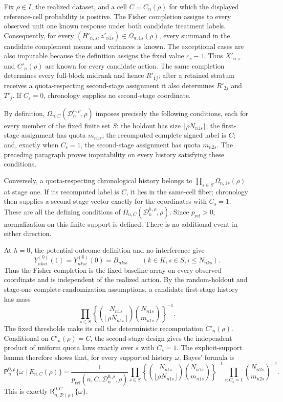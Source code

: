Fix \(\rho\in I\), the realized dataset, and a cell \(C=C_n(\rho)\) for which the displayed reference-cell probability is positive.  The Fisher completion assigns to every observed unit one known response under both candidate treatment labels.  Consequently, for every \((H'_{n,s},z'_{n1s})\in\Omega_{n,1s}(\rho)\), every summand in the candidate complement means and variances is known.  The exceptional cases are also imputable because the definition assigns the fixed value \(c_s-1\).  Thus \(X'_{n,s}\) and \(C'_n(\rho)\) are known for every candidate action.  The same completion determines every full-block midrank and hence \(R'_{1j}\); after a retained stratum receives a quota-respecting second-stage assignment it also determines \(R'_{2j}\) and \(T'_j\).  If \(C_s=0\), chronology supplies no second-stage coordinate.

By definition, \(\Omega_{n,C}(\mathcal D_n^{h,\rho},\rho)\) imposes precisely the following conditions, each for every member of the fixed finite set \(S\): the holdout has size \(\lfloor\rho N_{n1s}\rfloor\); the first-stage assignment has quota \(m_{n1s}\); the recomputed complete signed label is \(C\); and, exactly when \(C_s=1\), the second-stage assignment has quota \(m_{n2s}\).  The preceding paragraph proves imputability on every history satisfying these conditions.

Conversely, a quota-respecting chronological history belongs to \(\prod_{s\in S}\Omega_{n,1s}(\rho)\) at stage one.  If its recomputed label is \(C\), it lies in the same-cell fiber; chronology then supplies a second-stage vector exactly for the coordinates with \(C_s=1\).  These are all the defining conditions of \(\Omega_{n,C}(\mathcal D_n^{h,\rho},\rho)\).  Since \(p_{\mathrm{ref}}>0\), normalization on this finite support is defined.  There is no additional event in either direction.

At \(h=0\), the potential-outcome definition and no interference give
\[
Y^{(0)}_{nksi}(1)=Y^{(0)}_{nksi}(0)=B_{nksi}
\qquad(k\in K, s\in S, i\le N_{nks}).
\]
Thus the Fisher completion is the fixed baseline array on every observed coordinate and is independent of the realized action.  By the random-holdout and stage-one complete-randomization assumptions, a candidate first-stage history has mass
\[
\prod_{s\in S}
\left\{
\binom{N_{n1s}}{\lfloor\rho N_{n1s}\rfloor}
\binom{N_{n1s}}{m_{n1s}}
\right\}^{-1}.
\]
The fixed thresholds make its cell the deterministic recomputation \(C'_n(\rho)\).  Conditional on \(C'_n(\rho)=C\), the second-stage design gives the independent product of uniform quota laws exactly over \(s\) with \(C_s=1\).  The explicit-support lemma therefore shows that, for every supported history \(\omega\), Bayes' formula is
\[
\mathsf P_n^{0,\rho}\{\omega\mid E_{n,C}(\rho)\}
=\frac{1}{p_{\mathrm{ref}}(n,C,\mathcal D_n^{0,\rho},\rho)}
\prod_{s\in S}
\left\{
\binom{N_{n1s}}{\lfloor\rho N_{n1s}\rfloor}
\binom{N_{n1s}}{m_{n1s}}
\right\}^{-1}
\prod_{s:C_s=1}\binom{N_{n2s}}{m_{n2s}}^{-1}.
\]
This is exactly \(\mathsf R_{n,\mathcal D(\rho)}^{0,C}\{\omega\}\).

